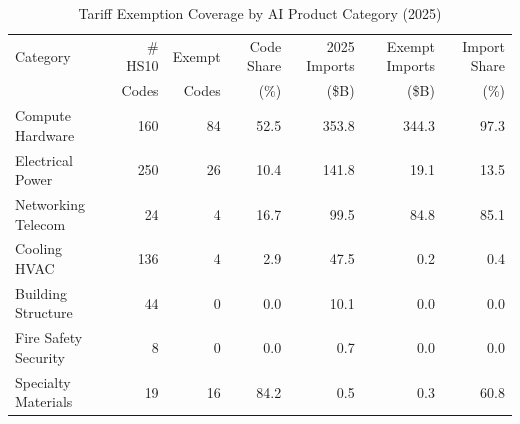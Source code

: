 \begin{table}[htbp]
\centering
\caption{Tariff Exemption Coverage by AI Product Category (2025)}
\label{tab:exemption_by_category}
\setlength{\tabcolsep}{3mm}
\renewcommand{\arraystretch}{1.60}
\begin{tabular}{lrrrrrr}
\toprule
Category & \# HS10 & Exempt & Code Share & 2025 Imports & Exempt Imports & Import Share \\
 & Codes & Codes & (\%) & (\$B) & (\$B) & (\%) \\
\midrule
Compute Hardware & 160 & 84 & 52.5 & 353.8 & 344.3 & 97.3 \\
Electrical Power & 250 & 26 & 10.4 & 141.8 & 19.1 & 13.5 \\
Networking Telecom & 24 & 4 & 16.7 & 99.5 & 84.8 & 85.1 \\
Cooling HVAC & 136 & 4 & 2.9 & 47.5 & 0.2 & 0.4 \\
Building Structure & 44 & 0 & 0.0 & 10.1 & 0.0 & 0.0 \\
Fire Safety Security & 8 & 0 & 0.0 & 0.7 & 0.0 & 0.0 \\
Specialty Materials & 19 & 16 & 84.2 & 0.5 & 0.3 & 60.8 \\
\bottomrule
\end{tabular}
\end{table}
